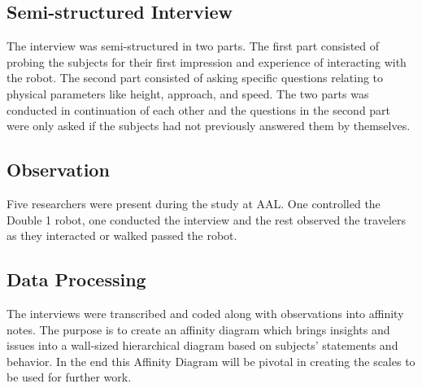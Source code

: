  \subsection{Semi-structured Interview}
 The interview was semi-structured in two parts. The first part consisted of probing the subjects for their first impression and experience of interacting with the robot. The second part consisted of asking specific questions relating to physical parameters like height, approach, and speed. The two parts was conducted in continuation of each other and the questions in the second part were only asked if the subjects had not previously answered them by themselves.
 
\subsection{Observation}
Five researchers were present during the study at AAL. One controlled the Double 1 robot, one conducted the interview and the rest observed the travelers as they interacted or walked passed the robot. 

\subsection{Data Processing}
The interviews were transcribed and coded along with observations into affinity notes. The purpose is to create an affinity diagram \cite{Wendell2005} which brings insights and issues into a wall-sized hierarchical diagram based on subjects' statements and behavior. In the end this Affinity Diagram will be pivotal in creating the scales to be used for further work.




